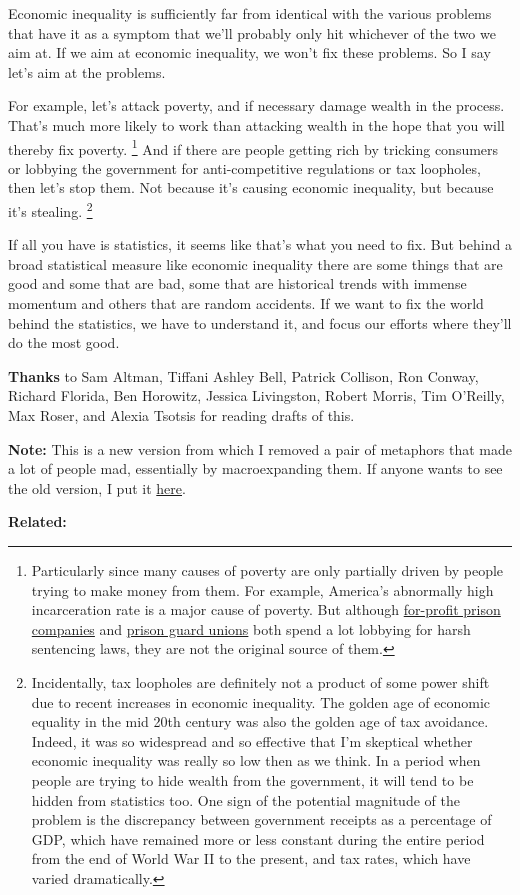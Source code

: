 Economic inequality is sufficiently far from identical with the various
problems that have it as a symptom that we'll probably only hit
whichever of the two we aim at. If we aim at economic inequality, we
won't fix these problems. So I say let's aim at the problems.

For example, let's attack poverty, and if necessary damage wealth in the
process. That's much more likely to work than attacking wealth in the
hope that you will thereby fix poverty. \footnote{Particularly since many causes of poverty are only partially
driven by people trying to make money from them. For example, America's
abnormally high incarceration rate is a major cause of poverty. But
although
\href{https://www.washingtonpost.com/posteverything/wp/2015/04/28/how-for-profit-prisons-have-become-the-biggest-lobby-no-one-is-talking-about/}{for-profit
prison companies} and
\href{http://mic.com/articles/41531/union-of-the-snake-how-california-s-prison-guards-subvert-democracy}{prison
guard unions} both spend a lot lobbying for harsh sentencing laws, they
are not the original source of them.} And if
there are people getting rich by tricking consumers or lobbying the
government for anti-competitive regulations or tax loopholes, then let's
stop them. Not because it's causing economic inequality, but because
it's stealing. \footnote{Incidentally, tax loopholes are definitely not a product of
some power shift due to recent increases in economic inequality. The
golden age of economic equality in the mid 20th century was also the
golden age of tax avoidance. Indeed, it was so widespread and so
effective that I'm skeptical whether economic inequality was really so
low then as we think. In a period when people are trying to hide wealth
from the government, it will tend to be hidden from statistics too. One
sign of the potential magnitude of the problem is the discrepancy
between government receipts as a percentage of GDP, which have remained
more or less constant during the entire period from the end of World War
II to the present, and tax rates, which have varied dramatically.}

If all you have is statistics, it seems like that's what you need to
fix. But behind a broad statistical measure like economic inequality
there are some things that are good and some that are bad, some that are
historical trends with immense momentum and others that are random
accidents. If we want to fix the world behind the statistics, we have to
understand it, and focus our efforts where they'll do the most good.


\textbf{Thanks} to Sam Altman, Tiffani Ashley Bell, Patrick Collison,
Ron Conway, Richard Florida, Ben Horowitz, Jessica Livingston, Robert
Morris, Tim O'Reilly, Max Roser, and Alexia Tsotsis for reading drafts
of this.

\textbf{Note:} This is a new version from which I removed a pair of
metaphors that made a lot of people mad, essentially by macroexpanding
them. If anyone wants to see the old version, I put it
\href{ineqold.html}{here}.

\textbf{Related:}